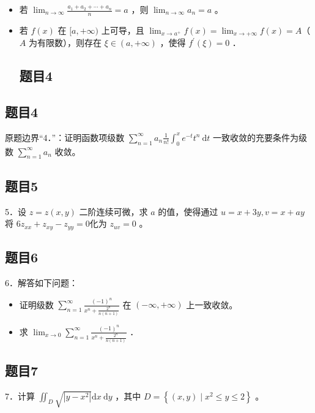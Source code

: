 \documentclass{article}
\begin{document}
\begin{itemize}
  \item[（1）] 若 \(\lim _{n \rightarrow \infty} \frac{a_{1}+a_{2}+\cdots+a_{n}}{n}=a\) ，则 \(\lim _{n \rightarrow \infty} a_{n}=a\) 。
  \item[（2）] 若 \(f(x)\) 在 \([a,+\infty)\) 上可导，且 \(\lim _{x \rightarrow a^{+}} f(x)=\lim _{x \rightarrow+\infty} f(x)=A\)（ \(A\) 为有限数），则存在 \(\xi \in(a,+\infty)\) ，使得 \(f^{\prime}(\xi)=0\) ．

\subsection{题目4}
\end{itemize}

\subsection{题目4}
原题边界“4．”：证明函数项级数 \(\sum_{n=1}^{\infty} a_{n} \frac{1}{n!} \int_{0}^{x} e^{-t} t^{n} \mathrm{~d} t\) 一致收敛的充要条件为级数 \(\sum_{n=1}^{\infty} a_{n}\) 收敛。

\subsection{题目5}
5．设 \(z=z(x, y)\) 二阶连续可微，求 \(a\) 的值，使得通过 \(u=x+3 y, v=x+a y\) 将 \(6 z_{x x}+z_{x y}-z_{y y}=0\)化为 \(z_{u v}=0\) 。

\subsection{题目6}
6．解答如下问题：

\begin{itemize}
  \item[（1）] 证明级数 \(\sum_{n=1}^{\infty} \frac{(-1)^{n}}{x^{n}+\frac{2^{n}}{n(n+1)}}\) 在 \((-\infty,+\infty)\) 上一致收敛。
  \item[（2）] 求 \(\lim _{x \rightarrow 0} \sum_{n=1}^{\infty} \frac{(-1)^{n}}{x^{n}+\frac{2^{n}}{n(n+1)}}\) ．
\end{itemize}

\subsection{题目7}
7．计算 \(\iint_{D} \sqrt{\left|y-x^{2}\right|} \mathrm{d} x \mathrm{~d} y\) ，其中 \(D=\left\{(x, y) \mid x^{2} \leq y \leq 2\right\}\) 。
\end{document}
